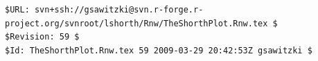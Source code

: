 \documentclass[dvips,12pt,a4paper,twoside]{amsart}
\begin{document}
%

%
%
%


\ifx\private\undefined%
\else
\printindex
\fi

\ifx\private\undefined%
\else
\noindent
{\tiny%
\verb|$URL: svn+ssh://gsawitzki@svn.r-forge.r-project.org/svnroot/lshorth/Rnw/TheShorthPlot.Rnw.tex $|\\
\verb+$Revision: 59 $+\\
\verb+$Id: TheShorthPlot.Rnw.tex 59 2009-03-29 20:42:53Z gsawitzki $+
}
\fi
\end{document}
